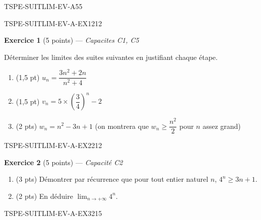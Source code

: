 \begin{evaluation}{TSPE-SUITLIM-EV-A}{55}


\begin{exercice}{TSPE-SUITLIM-EV-A-EX1}{2}{12}

\textbf{Exercice 1} (5 points) — \textit{Capacites C1, C5}

\medskip

Déterminer les limites des suites suivantes en justifiant chaque étape.

\begin{enumerate}
  \item (1,5 pt) $u_n = \dfrac{3n^2 + 2n}{n^2 + 4}$
  \item (1,5 pt) $v_n = 5 \times \left(\dfrac{3}{4}\right)^n - 2$
  \item (2 pts) $w_n = n^2 - 3n + 1$ (on montrera que $w_n \geq \dfrac{n^2}{2}$ pour $n$ assez grand)
\end{enumerate}

\end{exercice}


\begin{exercice}{TSPE-SUITLIM-EV-A-EX2}{2}{12}

\textbf{Exercice 2} (5 points) — \textit{Capacité C2}

\medskip

\begin{enumerate}
  \item (3 pts) Démontrer par récurrence que pour tout entier naturel $n$, $4^n \geq 3n + 1$.
  \item (2 pts) En déduire $\lim_{n \to +\infty} 4^n$.
\end{enumerate}

\end{exercice}


\begin{exercice}{TSPE-SUITLIM-EV-A-EX3}{2}{15}


\end{exercice}
\end{evaluation}
